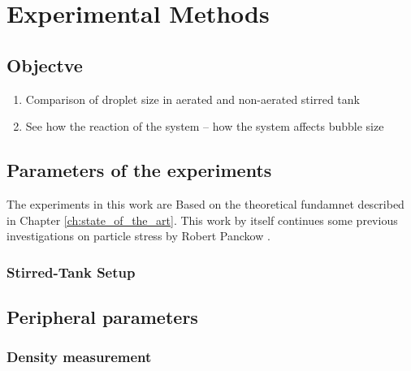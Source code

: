 \chapter{Experimental Methods} \label{ch:experimentalMethods}

\section{Objectve}
\begin{enumerate}
  \item Comparison of droplet size in aerated and non-aerated stirred tank
  \item See how the reaction of the system -- how the system affects bubble size
\end{enumerate}

\section{Parameters of the experiments}
The experiments in this work are Based on the theoretical fundamnet described in Chapter \ref{ch:state_of_the_art}. This work by itself continues some previous investigations on particle stress by Robert Panckow .

\subsection{Stirred-Tank Setup}


\section{Peripheral parameters}

\subsection{Density measurement}
